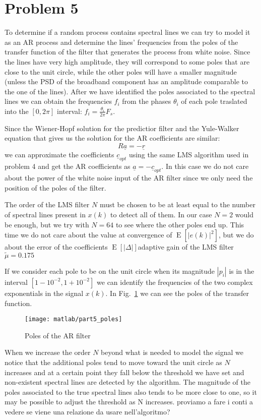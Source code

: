 \documentclass{article}
\renewcommand{\vec}[1]{\underline{#1}}
\newcommand{\E}[1]{\operatorname{E}\left[#1\right]}
\newcommand{\abs}[1]{\left|#1\right|}
\begin{document}
\section*{Problem 5}
To determine if a random process contains spectral lines we can try to
model it as an AR process and determine the lines' frequencies from
the poles of the transfer function of the filter that generates the
process from white noise. Since the lines have very high amplitude,
they will correspond to some poles that are close to the unit circle,
while the other poles will have a smaller magnitude (unless the PSD of
the broadband component has an amplitude comparable to the one of the
lines). After we have identified the poles associated to the spectral
lines we can obtain the frequencies $f_i$ from the phases $\theta_i$
of each pole traslated into the $[0,2\pi]$ interval: $f_i =
\frac{\theta_i}{2\pi}F_s$.

Since the Wiener-Hopf solution for the predictior filter and the
Yule-Walker equation that gives us the solution for the AR coefficients
are similar:
\[ R\vec{a} = -\vec{r} \]
we can approximate the coefficients $\vec{c}_{opt}$ using the same LMS
algorithm used in problem 4 and get the AR coefficients as $ \vec{a} =
-\vec{c}_{opt}$. In this case we do not care about the power of the
white noise input of the AR filter since we only need the position of
the poles of the filter.

The order of the LMS filter $N$ must be chosen to be at least equal to
the number of spectral lines present in $x(k)$ to detect all of
them. In our case $N=2$ would be enough, but we try with $N=64$ to see
where the other poles end up. This time we do not care about the value
at convergence of $\E{\abs{e(k)}^2}$, {\color{red} but we do about the
  error of the coefficients $\E{\abs{\Delta}}$adaptive gain of the LMS
  filter $\tilde{\mu} = 0.175$}

If we consider each pole to be on the unit circle when its magnitude
$|p_i|$ is in the interval $[1-10^{-2},1+10^{-2}]$ we can identify the
frequencies of the two complex exponentials in the signal $x(k)$. In
Fig.~\ref{plot:part5_poles} we can see the poles of the transfer
function.
\begin{figure}[htbp]
  \centering
  \texttt{[image: matlab/part5\_poles]}
  \caption{Poles of the AR filter}
  \label{plot:part5_poles}
\end{figure}

When we increase the order $N$ beyond what is needed
to model the signal we notice that the additional poles tend to move
toward the unit circle as $N$ increases and at a certain point they
fall below the threshold we have set and non-existent spectral lines
are detected by the algorithm. The magnitude of the poles associated
to the true spectral lines also tends to be more close to one, so it
may be possible to adjust the threshold as N increases. {\color{red}
  proviamo a fare i conti a vedere se viene una relazione da usare
  nell'algoritmo?}
\end{document}
